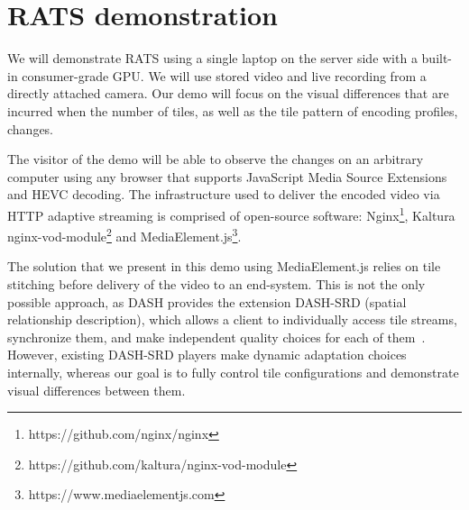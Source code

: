 \section{RATS demonstration} \label{infra}

We will demonstrate RATS using a single laptop on the server side with a built-in consumer-grade GPU. We will use stored video and live recording from a directly attached camera. Our demo will focus on the visual differences that are incurred when the number of tiles, as well as the tile pattern of encoding profiles, changes.

The visitor of the demo will be able to observe the changes on an arbitrary computer using any browser that supports JavaScript Media Source Extensions and HEVC decoding.
The infrastructure used to deliver the encoded video via HTTP adaptive streaming is comprised of open-source software: Nginx\footnote{https://github.com/nginx/nginx}, Kaltura nginx-vod-module\footnote{https://github.com/kaltura/nginx-vod-module} and MediaElement.js\footnote{https://www.mediaelementjs.com}.

The solution that we present in this demo using MediaElement.js relies on tile stitching before delivery of the video to an end-system.	
This is not the only possible approach, as DASH provides the extension DASH-SRD (spatial relationship description), which allows a client to individually access tile streams, synchronize them, and make independent quality choices for each of them~\cite{niamut2016}.
However, existing DASH-SRD players make dynamic adaptation choices internally, whereas our goal is to fully control tile configurations and demonstrate visual differences between them.



